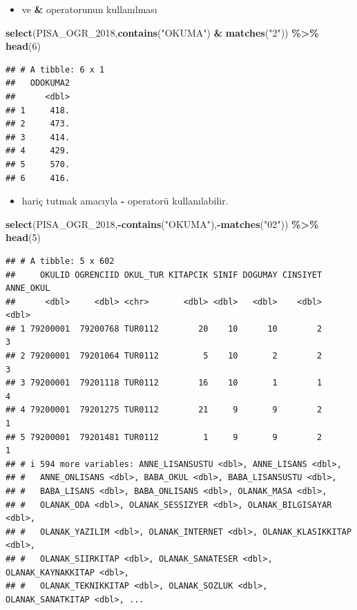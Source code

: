\documentclass[
  oneside]{book}
\newenvironment{Shaded}{\begin{snugshade}}{\end{snugshade}}
\newcommand{\DecValTok}[1]{\textcolor[rgb]{0.00,0.00,0.81}{#1}}
\newcommand{\FunctionTok}[1]{\textcolor[rgb]{0.13,0.29,0.53}{\textbf{#1}}}
\newcommand{\NormalTok}[1]{#1}
\newcommand{\SpecialCharTok}[1]{\textcolor[rgb]{0.81,0.36,0.00}{\textbf{#1}}}
\newcommand{\StringTok}[1]{\textcolor[rgb]{0.31,0.60,0.02}{#1}}
\providecommand{\tightlist}{%
  \setlength{\itemsep}{0pt}\setlength{\parskip}{0pt}}
\begin{document}
\begin{itemize}
\tightlist
\item
  ve \textbf{\&} operatorunun kullanılması
\end{itemize}

\begin{Shaded}
\begin{Highlighting}[]
\FunctionTok{select}\NormalTok{(PISA\_OGR\_2018,}\FunctionTok{contains}\NormalTok{(}\StringTok{"OKUMA"}\NormalTok{) }\SpecialCharTok{\&} \FunctionTok{matches}\NormalTok{(}\StringTok{"2"}\NormalTok{)) }\SpecialCharTok{\%\textgreater{}\%} \FunctionTok{head}\NormalTok{(}\DecValTok{6}\NormalTok{)}
\end{Highlighting}
\end{Shaded}

\begin{verbatim}
## # A tibble: 6 x 1
##   ODOKUMA2
##      <dbl>
## 1     418.
## 2     473.
## 3     414.
## 4     429.
## 5     570.
## 6     416.
\end{verbatim}

\begin{itemize}
\tightlist
\item
  hariç tutmak amacıyla \textbf{-} operatorü kullanılabilir.
\end{itemize}

\begin{Shaded}
\begin{Highlighting}[]
\FunctionTok{select}\NormalTok{(PISA\_OGR\_2018,}\SpecialCharTok{{-}}\FunctionTok{contains}\NormalTok{(}\StringTok{"OKUMA"}\NormalTok{),}\SpecialCharTok{{-}}\FunctionTok{matches}\NormalTok{(}\StringTok{"02"}\NormalTok{))  }\SpecialCharTok{\%\textgreater{}\%} \FunctionTok{head}\NormalTok{(}\DecValTok{5}\NormalTok{)}
\end{Highlighting}
\end{Shaded}

\begin{verbatim}
## # A tibble: 5 x 602
##     OKULID OGRENCIID OKUL_TUR KITAPCIK SINIF DOGUMAY CINSIYET ANNE_OKUL
##      <dbl>     <dbl> <chr>       <dbl> <dbl>   <dbl>    <dbl>     <dbl>
## 1 79200001  79200768 TUR0112        20    10      10        2         3
## 2 79200001  79201064 TUR0112         5    10       2        2         3
## 3 79200001  79201118 TUR0112        16    10       1        1         4
## 4 79200001  79201275 TUR0112        21     9       9        2         1
## 5 79200001  79201481 TUR0112         1     9       9        2         1
## # i 594 more variables: ANNE_LISANSUSTU <dbl>, ANNE_LISANS <dbl>,
## #   ANNE_ONLISANS <dbl>, BABA_OKUL <dbl>, BABA_LISANSUSTU <dbl>,
## #   BABA_LISANS <dbl>, BABA_ONLISANS <dbl>, OLANAK_MASA <dbl>,
## #   OLANAK_ODA <dbl>, OLANAK_SESSIZYER <dbl>, OLANAK_BILGISAYAR <dbl>,
## #   OLANAK_YAZILIM <dbl>, OLANAK_INTERNET <dbl>, OLANAK_KLASIKKITAP <dbl>,
## #   OLANAK_SIIRKITAP <dbl>, OLANAK_SANATESER <dbl>, OLANAK_KAYNAKKITAP <dbl>,
## #   OLANAK_TEKNIKKITAP <dbl>, OLANAK_SOZLUK <dbl>, OLANAK_SANATKITAP <dbl>, ...
\end{verbatim}
\end{document}
